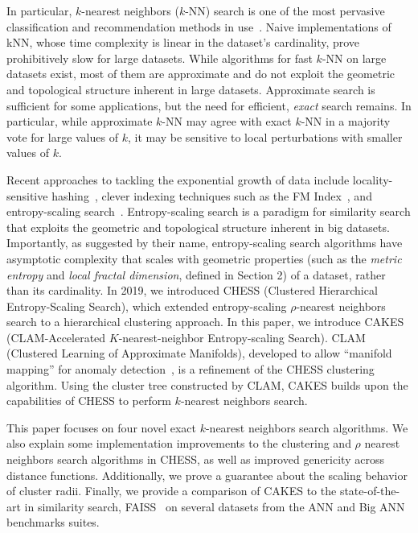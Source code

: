 In particular, $k$-nearest neighbors ($k$-NN) search is one of the most pervasive classification and recommendation methods in use~\cite{fix1952discriminatory, cover1967nearest}. 
Naive implementations of kNN, whose time complexity is linear in the dataset's cardinality, 
prove prohibitively slow for large datasets. While algorithms for fast $k$-NN on large datasets exist, most of them are approximate and do not 
exploit the geometric and topological structure inherent in large datasets. Approximate search is sufficient for some applications, but the 
need for efficient, \emph{exact} search remains.
In particular, while approximate $k$-NN may agree with exact $k$-NN in a majority vote for large values of $k$, it may be sensitive to local perturbations with smaller values of $k$.

Recent approaches to tackling the exponential growth of data include locality-sensitive hashing~\cite{indyk1999sublinear}, 
clever indexing techniques such as the FM Index~\cite{simpson2010efficient}, and entropy-scaling search~\cite{yu2015entropy, ishaq2019clustered}. 
Entropy-scaling search is a paradigm for similarity search that exploits the geometric and topological structure inherent in big datasets.
Importantly, as suggested by their name, entropy-scaling search algorithms have asymptotic complexity that scales with geometric properties (such as the 
\emph{metric entropy} and \emph{local fractal dimension}, defined in Section 2) of a dataset,
rather than its cardinality. In 2019, we introduced CHESS (Clustered Hierarchical Entropy-Scaling Search), which extended entropy-scaling $\rho$-nearest 
neighbors search to a hierarchical clustering approach. In this paper, we introduce CAKES (CLAM-Accelerated $K$-nearest-neighbor 
Entropy-scaling Search). CLAM (Clustered Learning of Approximate Manifolds), developed to allow ``manifold mapping'' for anomaly detection~\cite{ishaq2021clustered}, is a refinement of the CHESS clustering algorithm. 
Using the cluster tree constructed by CLAM, CAKES builds upon the capabilities of CHESS to perform
$k$-nearest neighbors search. 


This paper focuses on four novel exact $k$-nearest neighbors search algorithms. We also explain some 
implementation improvements to the clustering and $\rho$ nearest neighbors search algorithms in CHESS, 
as well as improved genericity across distance functions. Additionally, we prove a guarantee about the scaling behavior of cluster radii. 
Finally, we provide a comparison of 
CAKES to the state-of-the-art in similarity search, FAISS~\cite{johnson2019billion} on several datasets 
from the ANN and Big ANN benchmarks suites. 